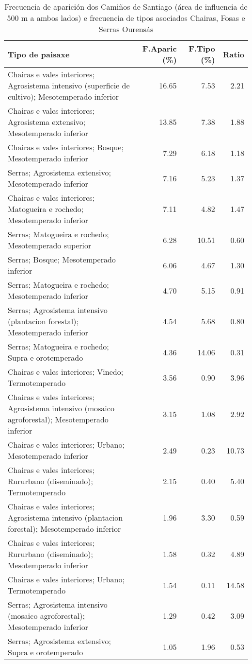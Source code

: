 \begin{table}[p]
\centering
\caption{Frecuencia de aparición dos Camiños de Santiago (área de influencia de 500 m a ambos lados) e frecuencia de tipos asociados Chairas, Fosas e Serras Ourensás} 
\label{vcamino8}
\begin{tabular}{lrrr}
  \hline
Tipo de paisaxe & F.Aparic (\%) & F.Tipo (\%) & Ratio \\ 
  \hline
Chairas e vales interiores; Agrosistema intensivo (superficie de cultivo); Mesotemperado inferior & 16.65 & 7.53 & 2.21 \\ 
  Chairas e vales interiores; Agrosistema extensivo; Mesotemperado inferior & 13.85 & 7.38 & 1.88 \\ 
  Chairas e vales interiores; Bosque; Mesotemperado inferior & 7.29 & 6.18 & 1.18 \\ 
  Serras; Agrosistema extensivo; Mesotemperado inferior & 7.16 & 5.23 & 1.37 \\ 
  Chairas e vales interiores; Matogueira e rochedo; Mesotemperado inferior & 7.11 & 4.82 & 1.47 \\ 
  Serras; Matogueira e rochedo; Mesotemperado superior & 6.28 & 10.51 & 0.60 \\ 
  Serras; Bosque; Mesotemperado inferior & 6.06 & 4.67 & 1.30 \\ 
  Serras; Matogueira e rochedo; Mesotemperado inferior & 4.70 & 5.15 & 0.91 \\ 
  Serras; Agrosistema intensivo (plantacion forestal); Mesotemperado inferior & 4.54 & 5.68 & 0.80 \\ 
  Serras; Matogueira e rochedo; Supra e orotemperado & 4.36 & 14.06 & 0.31 \\ 
  Chairas e vales interiores; Vinedo; Termotemperado & 3.56 & 0.90 & 3.96 \\ 
  Chairas e vales interiores; Agrosistema intensivo (mosaico agroforestal); Mesotemperado inferior & 3.15 & 1.08 & 2.92 \\ 
  Chairas e vales interiores; Urbano; Mesotemperado inferior & 2.49 & 0.23 & 10.73 \\ 
  Chairas e vales interiores; Rururbano (diseminado); Termotemperado & 2.15 & 0.40 & 5.40 \\ 
  Chairas e vales interiores; Agrosistema intensivo (plantacion forestal); Mesotemperado inferior & 1.96 & 3.30 & 0.59 \\ 
  Chairas e vales interiores; Rururbano (diseminado); Mesotemperado inferior & 1.58 & 0.32 & 4.89 \\ 
  Chairas e vales interiores; Urbano; Termotemperado & 1.54 & 0.11 & 14.58 \\ 
  Serras; Agrosistema intensivo (mosaico agroforestal); Mesotemperado inferior & 1.29 & 0.42 & 3.09 \\ 
  Serras; Agrosistema extensivo; Supra e orotemperado & 1.05 & 1.96 & 0.53 \\ 
   \hline
\end{tabular}
\end{table}
